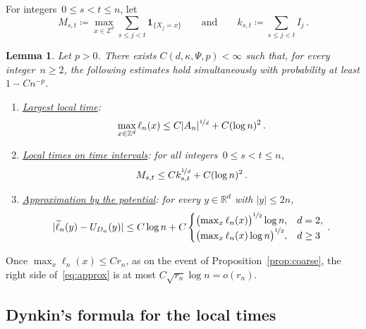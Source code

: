 \documentclass[11pt]{amsart}
\theoremstyle{plain}
\newtheorem{lemma}[theorem]{Lemma}
\theoremstyle{definition}
\newcommand{\Z}{\mathbb Z}
\newcommand{\R}{\mathbb R}
\newcommand{\drift}{\kappa}
\newcommand{\gauge}{\Psi}
\newcommand{\ind}{\mathbf 1}
\newcommand{\nf}{\nicefrac}
\numberwithin{equation}{section}
\begin{document}
For integers~$0\leq s<t\leq n$, let
\begin{equation*}
M_{s,t}\coloneqq\max_{x\in\Z^d}\sum_{s\leq j<t}\ind_{\{X_j=x\}}
\qquad\text{and}\qquad
k_{s,t}\coloneqq\sum_{s\leq j<t}I_j\, .
\end{equation*}

\begin{lemma}\label{lem:local}
Let $p>0$. There exists $C(d,\drift,\gauge,p)<\infty$ such that, for every integer~$n\geq2$, the following estimates hold simultaneously with probability at least $1-Cn^{-p}$.
\begin{enumerate}[label=\textup{(\roman*)}]
\item \underline{\emph{Largest local time}}:
\begin{equation}\label{eq:M}
\max_{x\in\Z^d}\ell_n(x)\leq C|A_n|^{\nf{1}{d}}+C(\log n)^2\, .
\end{equation}
\item \underline{\emph{Local times on time intervals}}: for all integers~$0\leq s<t\leq n$,
\begin{equation}\label{eq:interval}
M_{s,t}\leq Ck_{s,t}^{\nf{1}{d}}+C(\log n)^2\, .
\end{equation}
\item \underline{\emph{Approximation by the potential}}: for every $y\in\R^d$ with $|y|\leq2n$,
\begin{equation}\label{eq:approx}
|\widetilde\ell_n(y)-U_{D_n}(y)|\leq C\log n+C\begin{cases}\bigl(\max_x\ell_n(x)\bigr)^{\nf12}\log n,&d=2,\\\bigl(\max_x\ell_n(x)\log n\bigr)^{\nf12},&d\geq3\end{cases}\, .
\end{equation}
\end{enumerate}
\end{lemma}

Once $\max_x\ell_n(x)\leq Cr_n$, as on the event of Proposition~\ref{prop:coarse}, the right side of~\eqref{eq:approx} is at most $C\sqrt{r_n}\log n=o(r_n)$.

\subsection{Dynkin's formula for the local times}\label{sec:dynkin}
\end{document}
